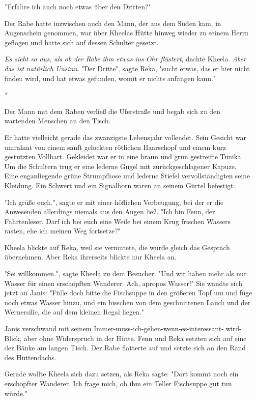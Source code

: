 \documentclass[10pt, a4paper, oneside]{book}
\begin{document}
\begin{multicols}{2}
"Erfahre ich auch noch etwas über den Dritten?" 

Der Rabe hatte inzwischen auch den Mann, der aus dem Süden kam, in Augenschein genommen, war über Kheelas Hütte hinweg wieder zu seinem Herrn geflogen und hatte sich auf dessen Schulter gesetzt. 

\textit{Es sieht so aus, als ob der Rabe ihm etwas ins Ohr flüstert}, dachte Kheela. \textit{Aber das ist natürlich Unsinn}. 
"Der Dritte", sagte Reka, "sucht etwas, das er hier nicht finden wird, und hat etwas gefunden, womit er nichts anfangen kann." 

\begin{center}
    * 
\end{center}

Der Mann mit dem Raben verließ die Uferstraße und begab sich zu den 
wartenden Menschen an den Tisch.

Er hatte vielleicht gerade das zwanzigste Lebensjahr vollendet. Sein Gesicht war umrahmt von einem sanft gelockten rötlichen Haarschopf und einem kurz gestutzten Vollbart. Gekleidet war er in eine braun und grün gestreifte Tunika. Um die Schultern trug er eine lederne Gugel mit zurückgeschlagener Kapuze. Eine enganliegende grüne Strumpfhose und lederne Stiefel vervollständigten seine Kleidung. Ein Schwert und ein Signalhorn waren an seinem Gürtel befestigt. 

"Ich grüße euch.", sagte er mit einer höflichen Verbeugung, bei der er die Anwesenden allerdings niemals aus den Augen ließ. "Ich bin Fenn, der Fährtenleser. Darf ich bei euch eine Weile bei einem Krug frischen Wassers rasten, ehe ich meinen Weg fortsetze?" 

Kheela blickte auf Reka, weil sie vermutete, die würde gleich das Gespräch übernehmen. Aber Reka ihrerseits blickte nur Kheela an. 

"Sei willkommen.", sagte Kheela zu dem Besucher. "Und wir haben mehr als nur Wasser für einen erschöpften Wanderer. Ach, apropos Wasser!" Sie wandte sich jetzt an Janis: "Fülle doch bitte die Fischsuppe in den größeren Topf um und füge noch etwas Wasser hinzu, und ein bisschen von dem geschnittenen Lauch und der Wernersilie, die auf dem kleinen Regal liegen." 

Janis verschwand mit seinem Immer-muss-ich-gehen-wenn-es-interessant- wird-Blick, aber ohne Widerspruch in der Hütte. Fenn und Reka setzten sich auf eine der Bänke am langen Tisch. Der Rabe flatterte auf und setzte sich an den Rand des Hüttendachs. 

Gerade wollte Kheela sich dazu setzen, als Reka sagte: "Dort kommt noch ein erschöpfter Wanderer. Ich frage mich, ob ihm ein Teller Fischsuppe gut tun würde." 


\end{multicols}
\end{document}
